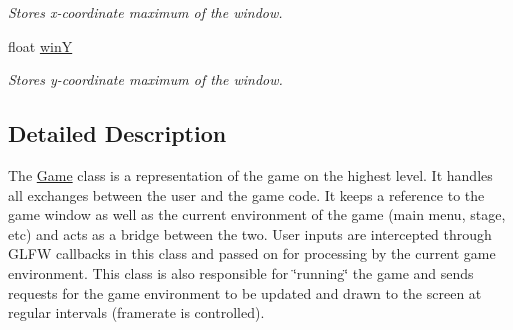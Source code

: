 \begin{DoxyCompactItemize}
\begin{DoxyCompactList}\small\item\em Stores x-\/coordinate maximum of the window. \end{DoxyCompactList}\item 
float \hyperlink{class_game_a04e6773bb06f62871bcab40fc907335a}{winY}\hypertarget{class_game_a04e6773bb06f62871bcab40fc907335a}{}\label{class_game_a04e6773bb06f62871bcab40fc907335a}

\begin{DoxyCompactList}\small\item\em Stores y-\/coordinate maximum of the window. \end{DoxyCompactList}\end{DoxyCompactItemize}


\subsection{Detailed Description}
The \hyperlink{class_game}{Game} class is a representation of the game on the highest level. It handles all exchanges between the user and the game code. It keeps a reference to the game window as well as the current environment of the game (main menu, stage, etc) and acts as a bridge between the two. User inputs are intercepted through G\+L\+FW callbacks in this class and passed on for processing by the current game environment. This class is also responsible for \char`\"{}running\char`\"{} the game and sends requests for the game environment to be updated and drawn to the screen at regular intervals (framerate is controlled). 